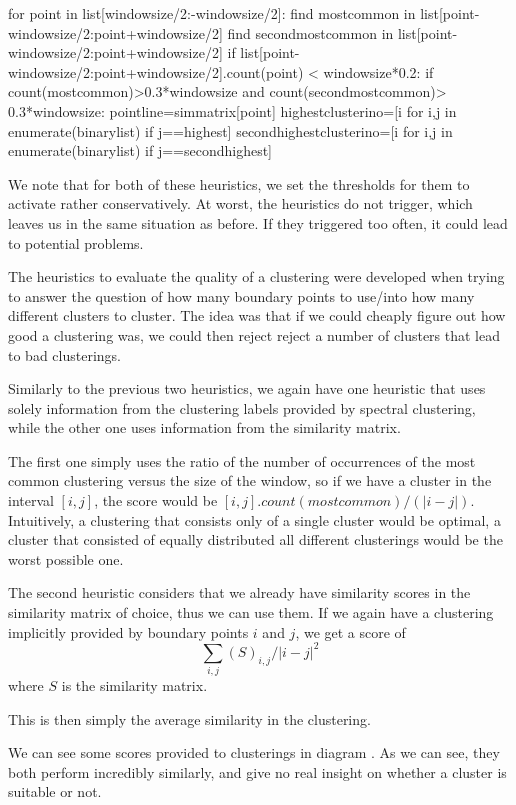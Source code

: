 for point in list[windowsize/2:-windowsize/2]:
find mostcommon in list[point-windowsize/2:point+windowsize/2]
find secondmostcommon in list[point-windowsize/2:point+windowsize/2]
if list[point-windowsize/2:point+windowsize/2].count(point) < windowsize*0.2:
if count(mostcommon)>0.3*windowsize and count(secondmostcommon)> 0.3*windowsize: 
pointline=simmatrix[point]
highestclusterino=[i for i,j in enumerate(binarylist) if j==highest]
secondhighestclusterino=[i for i,j in enumerate(binarylist) if j==secondhighest]

We note that for both of these heuristics, we set the thresholds for them to activate rather conservatively. At worst, the heuristics do not trigger, which leaves us in the same situation as before. If they triggered too often, it could lead to potential problems.

The heuristics to evaluate the quality of a clustering were developed when trying to answer the question of how many boundary points to use/into how many different clusters to cluster. The idea was that if we could cheaply figure out how good a clustering was, we could then reject reject a number of clusters that lead to bad clusterings.

Similarly to the previous two heuristics, we again have one heuristic that uses solely information from the clustering labels provided by spectral clustering, while the other one uses information from the similarity matrix. 

The first one simply uses the ratio of the number of occurrences of the most common clustering versus the size of the window, so if we have a cluster in the interval $[i,j]$, the score would be $[i,j].count(mostcommon)/(|i-j|)$.  Intuitively, a clustering that consists only of a single cluster would be optimal, a cluster that consisted of equally distributed all different clusterings would be the worst possible one.

The second heuristic considers that we already have similarity scores in the similarity matrix of choice, thus we can use them. If we again have a clustering implicitly provided by boundary points $i$ and $j$, we get a score of
\[
\sum\limits_{i,j} (S)_{i,j}/|i-j|^2
\]
where $S$ is the similarity matrix. 

This is then simply the average similarity in the clustering.

We can see some scores provided to clusterings in diagram . As we can see, they both perform incredibly similarly, and give no real insight on whether a cluster is suitable or not. 

